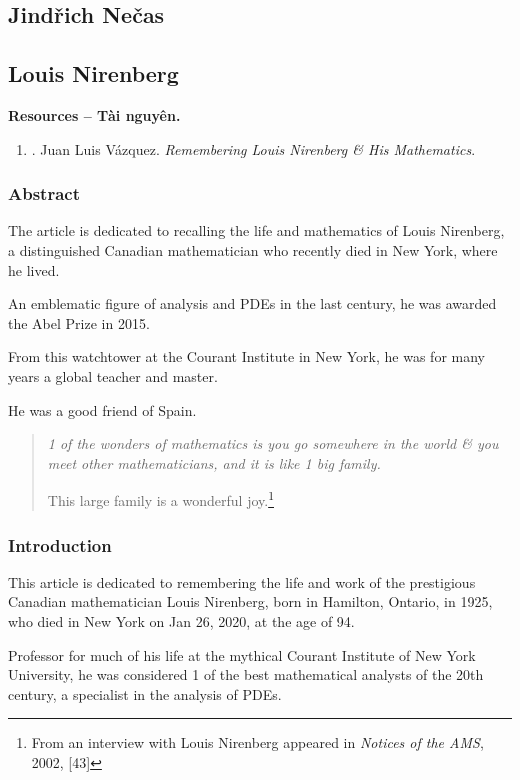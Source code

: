 \documentclass{article}
\begin{document}
\subsection{Jind\v{r}ich Ne\v{c}as}


\subsection{Louis Nirenberg}
\textbf{\textsf{Resources -- Tài nguyên.}}
\begin{enumerate}
	\item \cite{Vazquez2020}. {\sc Juan Luis V\'{a}zquez}. {\it Remembering Louis Nirenberg \& His Mathematics}.
\end{enumerate}

\subsubsection*{Abstract}
The article is dedicated to recalling the life and mathematics of Louis Nirenberg, a distinguished Canadian mathematician who recently died in New York, where he lived.

An emblematic figure of analysis and PDEs in the last century, he was awarded the Abel Prize in 2015.

From this watchtower at the Courant Institute in New York, he was for many years a global teacher and master.

He was a good friend of Spain.
\begin{quotation}\it
	1 of the wonders of mathematics is you go somewhere in the world \& you meet other mathematicians, and it is like 1 big family.
	
	This large family is a wonderful joy.\footnote{From an interview with Louis Nirenberg appeared in \textit{Notices of the AMS}, 2002, [43]}
\end{quotation}

\subsubsection{Introduction}
This article is dedicated to remembering the life and work of the prestigious Canadian mathematician Louis Nirenberg, born in Hamilton, Ontario, in 1925, who died in New York on Jan 26, 2020, at the age of 94.

Professor for much of his life at the mythical Courant Institute of New York University, he was considered 1 of the best mathematical analysts of the 20th century, a specialist in the analysis of PDEs.
\end{document}
